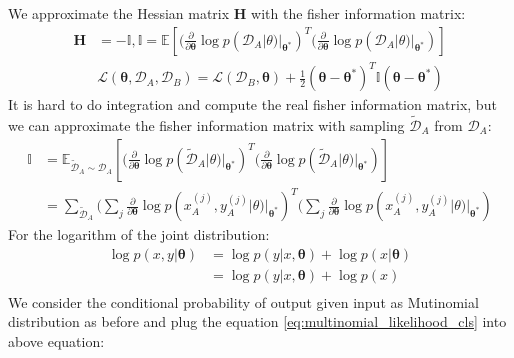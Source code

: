 \documentclass{article}
\begin{document}
We approximate the Hessian matrix $\boldsymbol{H}$ with the fisher information matrix:
\begin{equation}
\begin{split}
    \boldsymbol{H} &= - \mathbb{I}  ,\mathbb{I}  = \mathbb{E}[(\frac{\partial}{\partial \boldsymbol{\theta}}
    \log p(\mathcal D_A|\boldsymbol{}{\theta})|_{\boldsymbol{\theta^*}})^T
    (\frac{\partial}{\partial \boldsymbol{\theta}}
    \log p(\mathcal D_A|\boldsymbol{}{\theta})|_{\boldsymbol{\theta^*}})] \\
    &\mathcal L(\boldsymbol{\theta}, \mathcal D_A, \mathcal D_B)  = \mathcal L(\mathcal D_B, \boldsymbol{\theta}) 
    +\frac{1}{2}(\boldsymbol{\theta} - \boldsymbol{\theta^*})^T\mathbb{I} (\boldsymbol{\theta} - \boldsymbol{\theta^*})
\end{split}
\end{equation}
It is hard to do integration and compute the real fisher information matrix,
but we can approximate the fisher information matrix with
sampling $\tilde{\mathcal D}_A$ from $\mathcal D_A$:
\begin{equation}
    \begin{split}
    \mathbb{I} &= \mathbb{E}_{\tilde{\mathcal D}_A \sim \mathcal D_A}[(\frac{\partial}{\partial \boldsymbol{\theta}}
    \log p(\tilde{\mathcal D}_A|\boldsymbol{}{\theta})|_{\boldsymbol{\theta^*}})^T
    (\frac{\partial}{\partial \boldsymbol{\theta}}
    \log p(\tilde{\mathcal D}_A|\boldsymbol{}{\theta})|_{\boldsymbol{\theta^*}})]\\
    &= \sum_{\tilde{\mathcal D}_A} (\sum_j \frac{\partial}{\partial \boldsymbol{\theta}}
    \log p(x_A^{(j)}, y_A^{(j)}|\boldsymbol{}{\theta})|_{\boldsymbol{\theta^*}})^T
    (\sum_j
    \frac{\partial}{\partial \boldsymbol{\theta}}
    \log p(x_A^{(j)}, y_A^{(j)}|\boldsymbol{}{\theta})|_{\boldsymbol{\theta^*}})
\end{split}
\end{equation}
For the logarithm of the joint distribution:
\begin{equation}
\begin{split}
\log p(x, y|\boldsymbol{\theta})
&= \log p(y | x, \boldsymbol{\theta})
+ \log p(x | \boldsymbol{\theta})\\
&= \log p(y | x, \boldsymbol{\theta})
+ \log p(x)\\
\end{split}
\end{equation}
We consider the conditional probability of output given input
as Mutinomial distribution as before
and plug the equation \ref{eq:multinomial_likelihood_cls} into above equation:
\end{document}
